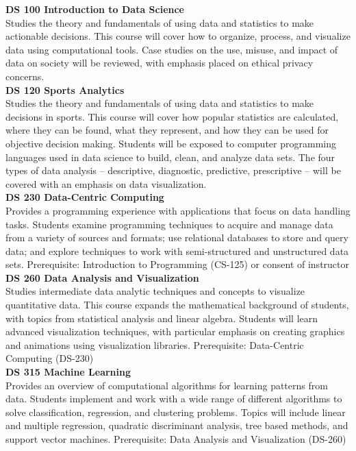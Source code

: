 \documentclass[
  letterpaper,
]{scrbook}
\begin{document}
\textbf{DS 100 Introduction to Data Science}\\
Studies the theory and fundamentals of using data and statistics to make
actionable decisions. This course will cover how to organize, process,
and visualize data using computational tools. Case studies on the use,
misuse, and impact of data on society will be reviewed, with emphasis
placed on ethical privacy concerns.\\
\textbf{DS 120 Sports Analytics}\\
Studies the theory and fundamentals of using data and statistics to make
decisions in sports. This course will cover how popular statistics are
calculated, where they can be found, what they represent, and how they
can be used for objective decision making. Students will be exposed to
computer programming languages used in data science to build, clean, and
analyze data sets. The four types of data analysis -- descriptive,
diagnostic, predictive, prescriptive -- will be covered with an emphasis
on data visualization.\\
\textbf{DS 230 Data-Centric Computing}\\
Provides a programming experience with applications that focus on data
handling tasks. Students examine programming techniques to acquire and
manage data from a variety of sources and formats; use relational
databases to store and query data; and explore techniques to work with
semi-structured and unstructured data sets. Prerequisite: Introduction
to Programming (CS-125) or consent of instructor\\
\textbf{DS 260 Data Analysis and Visualization}\\
Studies intermediate data analytic techniques and concepts to visualize
quantitative data. This course expands the mathematical background of
students, with topics from statistical analysis and linear algebra.
Students will learn advanced visualization techniques, with particular
emphasis on creating graphics and animations using visualization
libraries. Prerequisite: Data-Centric Computing (DS-230)\\
\textbf{DS 315 Machine Learning}\\
Provides an overview of computational algorithms for learning patterns
from data. Students implement and work with a wide range of different
algorithms to solve classification, regression, and clustering problems.
Topics will include linear and multiple regression, quadratic
discriminant analysis, tree based methods, and support vector machines.
Prerequisite: Data Analysis and Visualization (DS-260)\\
\end{document}
